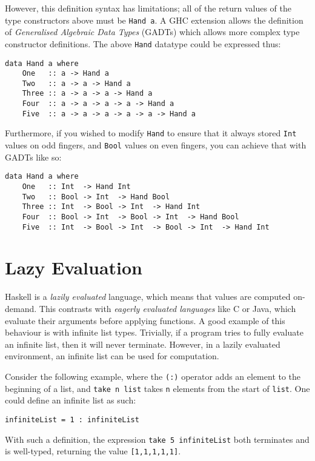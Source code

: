 \documentclass[12pt, a4paper, bibliography=totocnumbered]{scrreprt}
\newcommand{\inline}[1]{\lstinline[basicstyle=\ttfamily\footnotesize]{#1}}
\begin{document}
However, this definition syntax has limitations; all of the return values of the type constructors above must be \inline{Hand a}. A GHC extension allows the definition of \emph{Generalised Algebraic Data Types} (GADTs) \cite{gadts} which allows more complex type constructor definitions. The above \inline{Hand} datatype could be expressed thus:

\begin{lstlisting}
data Hand a where
    One   :: a -> Hand a
    Two   :: a -> a -> Hand a
    Three :: a -> a -> a -> Hand a
    Four  :: a -> a -> a -> a -> Hand a
    Five  :: a -> a -> a -> a -> a -> Hand a
\end{lstlisting}

Furthermore, if you wished to modify \inline{Hand} to ensure that it always stored \inline{Int} values on odd fingers, and \inline{Bool} values on even fingers, you can achieve that with GADTs like so:

\begin{lstlisting}
data Hand a where
    One   :: Int  -> Hand Int
    Two   :: Bool -> Int  -> Hand Bool
    Three :: Int  -> Bool -> Int  -> Hand Int
    Four  :: Bool -> Int  -> Bool -> Int  -> Hand Bool
    Five  :: Int  -> Bool -> Int  -> Bool -> Int  -> Hand Int
\end{lstlisting}

\section{Lazy Evaluation}

Haskell is a \emph{lazily evaluated} language, which means that values are computed on-demand. This contrasts with \emph{eagerly evaluated languages} like C or Java, which evaluate their arguments before applying functions. A good example of this behaviour is with infinite list types. Trivially, if a program tries to fully evaluate an infinite list, then it will never terminate. However, in a lazily evaluated environment, an infinite list can be used for computation.

Consider the following example, where the \inline{(:)} operator adds an element to the beginning of a list, and \inline{take n list} takes \inline{n} elements from the start of \inline{list}. One could define an infinite list as such:

\begin{lstlisting}
infiniteList = 1 : infiniteList
\end{lstlisting}

With such a definition, the expression \inline{take 5 infiniteList} both terminates and is well-typed, returning the value \inline{[1,1,1,1,1]}.
\end{document}
